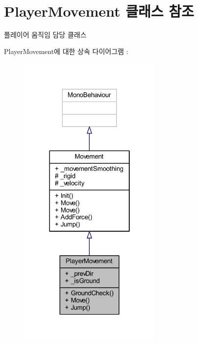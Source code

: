 \hypertarget{class_player_movement}{}\section{Player\+Movement 클래스 참조}
\label{class_player_movement}


플레이어 움직임 담당 클래스  




Player\+Movement에 대한 상속 다이어그램 \+: 
\nopagebreak
\begin{figure}[H]
\begin{center}
\leavevmode
\includegraphics[width=202pt]{de/d46/class_player_movement__inherit__graph}
\end{center}
\end{figure}


